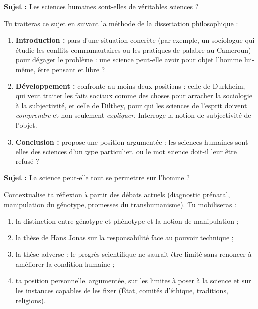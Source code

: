 \documentclass[11pt]{article}
\newcommand{\cle}[1]{{\popxbold\color{popdark}#1}}
\begin{document}
\begin{exercice}
\textbf{Sujet :} Les sciences humaines sont-elles de véritables sciences ?

Tu traiteras ce sujet en suivant la méthode de la dissertation philosophique :
\begin{enumerate}
\item \textbf{Introduction :} pars d'une situation concrète (par exemple, un sociologue qui étudie les conflits communautaires ou les pratiques de palabre au Cameroun) pour dégager le problème : une science peut-elle avoir pour objet l'homme lui-même, être pensant et libre ?
\item \textbf{Développement :} confronte au moins deux positions : celle de Durkheim, qui veut traiter les faits sociaux comme des choses pour arracher la sociologie à la subjectivité, et celle de Dilthey, pour qui les sciences de l'esprit doivent \emph{comprendre} et non seulement \emph{expliquer}. Interroge la notion de subjectivité de l'objet.
\item \textbf{Conclusion :} propose une position argumentée : les sciences humaines sont-elles des sciences d'un type particulier, ou le mot \cle{science} doit-il leur être refusé ?
\end{enumerate}
\end{exercice}

\begin{exercice}
\textbf{Sujet :} La science peut-elle tout se permettre sur l'homme ?

Contextualise ta réflexion à partir des débats actuels (diagnostic prénatal, manipulation du génotype, promesses du transhumanisme). Tu mobiliseras :
\begin{enumerate}
\item la distinction entre génotype et phénotype et la notion de manipulation ;
\item la thèse de Hans Jonas sur la responsabilité face au pouvoir technique ;
\item la thèse adverse : le progrès scientifique ne saurait être limité sans renoncer à améliorer la condition humaine ;
\item ta position personnelle, argumentée, sur les limites à poser à la science et sur les instances capables de les fixer (État, comités d'éthique, traditions, religions).
\end{enumerate}
\end{exercice}
\end{document}
